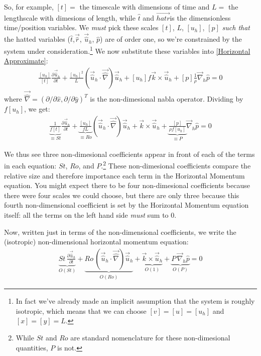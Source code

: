 So, for example, $[t]= $ the timescale with dimensions of time and $L= $ the lengthscale with dimesions of length, while $\hat{t}$ and $\vec{hat{r}}$is the dimensionless time/position variables. We \textit{must} pick these scales $[t]$, $L$, $[u_h]$, $[p]$ \textit{such that} the hatted variables ($\hat{t}$,$\vec{\hat{r}}$, $\vec{\hat{u}}_h$, $\hat{p}$) are of order one, so we're constrained by the system under consideration.\footnote{
    In fact we've already made an implicit assumption that the system is roughly isotropic, which means that we can choose $[v]=[u]=[u_h]$ and $[x]=[y]=L$.  
} We now substitute these variables into \ref{Horizontal Approximate}:
\begin{align*}
    \frac{[u_h]}{[t]}\frac{\partial\vec{\hat{u}}_h}{\partial t}+\frac{[u_h]^2}{L}\left( \vec{\hat{u}}_h\cdot\vec{\hat{\nabla}} \right)\vec{\hat{u}}_h+[u_h]f\vec{k}\times\vec{\hat{u}}_h+[p]\frac{1}{\rho}\vec{\nabla}_h\hat{p}=0
\end{align*}
where $\vec{\hat{\nabla}}=(\partial/\partial \hat{x},\partial/\partial \hat{y})^T$ is the non-dimesional nabla operator. Dividing by $f[u_h]$, we get:
\begin{align*}
    \underbrace{\boxed{\frac{1}{f[t]}}}_{\equiv St}\frac{\partial\vec{\hat{u}}_h}{\partial t}+\underbrace{\boxed{\frac{[u_h]}{fL}}}_{\equiv Ro}\left( \vec{\hat{u}}_h\cdot\vec{\hat{\nabla}} \right)\vec{\hat{u}}_h+\vec{k}\times\vec{\hat{u}}_h+\underbrace{\boxed{\frac{[p]}{\rho f [u_h]}}}_{\equiv P}\vec{\nabla}_h\hat{p}=0
\end{align*}

We thus see three non-dimesional coefficients appear in front of each of the terms in each equation: $St$, $Ro$, and $P$.\footnote{
    While $St$ and $Ro$ are standard nomenclature for these non-dimesional quantities, $P$ is not.
} These non-dimesional coefficients compare the relative size and therefore importance each term in the Horizontal Momentum equation. You might expect there to be four non-dimesional coefficients because there were four scales we could choose, but there are only three because this fourth non-dimensional coefficient is set by the Horizontal Momentum equation itself: all the terms on the left hand side \textit{must} sum to $0$.

Now, written just in terms of the non-dimensional coefficients, we write the (isotropic) non-dimensional horizontal momentum equation:
\begin{align}
    \label{Horizontal Approximate nondim}
    \underbrace{St\,\frac{\partial\vec{\hat{u}}_h}{\partial t}}_{O(St)}+
    \underbrace{Ro\,\left( \vec{\hat{u}}_h\cdot\vec{\hat{\nabla}} \right)\vec{\hat{u}}_h}_{O(Ro)}+
    \underbrace{\vec{k}\times\vec{\hat{u}}_h}_{O(1)}+
    \underbrace{P\,\vec{\nabla}_h\hat{p}}_{O(P)}=0
\end{align}

